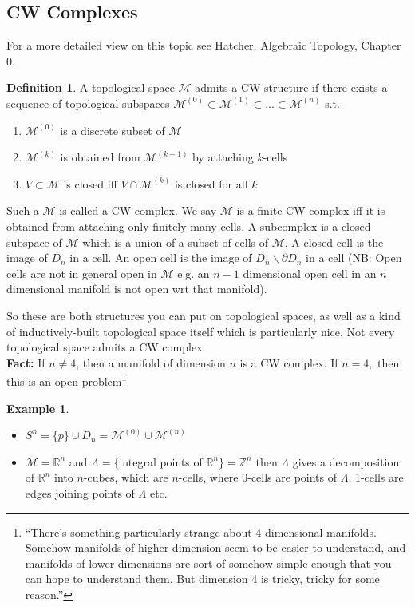 \documentclass[10pt]{article}
\theoremstyle{plain}
\theoremstyle{definition}
\newtheorem{defn}[thm]{Definition} %
\newtheorem{exmp}[thm]{Example} %
\newcommand{\Fact}{\textbf{Fact: }}
\newcommand{\Real}{\mathbb{R}}
\newcommand{\man}{\mathcal{M}}
\newcommand{\mysubsection}[1]{
    \subsection{#1}
}
\begin{document}
\mysubsection{CW Complexes}
For a more detailed view on this topic see Hatcher, Algebraic Topology, Chapter 0.

\begin{defn}
    A topological space $\man$ admits a CW structure if there exists a sequence of topological subspaces $\man^{(0)} \subset \man^{(1)}  \subset \ldots \subset \man^{(n)}$ s.t.
    \begin{enumerate}
        \item $\man^{(0)}$ is a discrete subset of $\man$
        \item $\man^{(k)}$ is obtained from $\man^{(k-1)}$ by attaching $k$-cells
        \item $V\subset \man$ is closed iff $V\cap \man^{(k)}$ is closed for all $k$
    \end{enumerate}
    Such a $\man$ is called a CW complex. We say $\man$ is a finite CW complex iff it is obtained from attaching only finitely many cells. A subcomplex is a closed subspace of $\man$ which is a union of a subset of cells of $\man$. A closed cell is the image of $D_n$ in a cell. An open cell is the image of $D_n\backslash \partial D_n$ in a cell (NB: Open cells are not in general open in $\man$ e.g. an $n-1$ dimensional open cell in an $n$ dimensional manifold is not open wrt that manifold).
\end{defn}
\noindent
So these are both structures you can put on topological spaces, as well as a kind of inductively-built topological space itself which is particularly nice. Not every topological space admits a CW complex.\\
\Fact If $n\neq 4$, then a manifold of dimension $n$ is a CW complex. If $n=4,$ then this is an open problem\footnote{``There's something particularly strange about 4 dimensional manifolds. Somehow manifolds of higher dimension seem to be easier to understand, and manifolds of lower dimensions are sort of somehow simple enough that you can hope to understand them. But dimension 4 is tricky, tricky for some reason.''}
\begin{exmp}
    \begin{itemize}
        \item $S^n = \{p\}\cup D_n = \man^{(0)}\cup \man^{(n)}$
        \item $\man = \Real^n$ and $\Lambda = \{$integral points of $\Real^n\} =\mathbb{Z}^n$ then $\Lambda$ gives a decomposition of $\Real^n$ into $n$-cubes, which are $n$-cells, where 0-cells are points of $\Lambda$, 1-cells are edges joining points of $\Lambda$ etc.
    \end{itemize}
\end{exmp}
\end{document}
